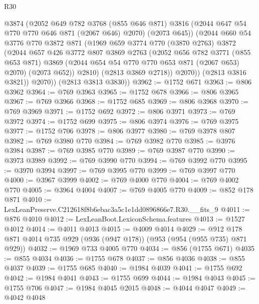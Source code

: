 \begin{lexlean}{R30}
\begin{coremodule}
              @3874
              (@2052
                @649
                @782
                @3768
                (@855 @646 @871)
                @3816
                (@2044 @647 @54 @770 @770 @646 @871 (@2067 @646) @2070)
                (@2073 @645))
              (@2044
                @660
                @54
                @3776
                @770
                @3872
                @871
                (@1969
                  @659
                  @3774
                  @770
                  (@3870 @2763)
                  @3872
                  (@2044
                    @657
                    @426
                    @3772
                    @807
                    @3869
                    @2763
                    (@2052
                      @656
                      @782
                      @3771
                      (@855 @653 @871)
                      @3869
                      (@2044 @654 @54 @770 @770 @653 @871 (@2067 @653) @2070)
                      (@2073 @652))
                    @2810)
                  (@2813 @3869 @2718))
                @2070))
            (@2813 @3816 @3821))
          @2070))
      (@2813 @3813 @3830))
@3962 := @1752 @671
@3963 := @806 @3962
@3964 := @769 @3963
@3965 := @1752 @678
@3966 := @806 @3965
@3967 := @769 @3966
@3968 := @1752 @685
@3969 := @806 @3968
@3970 := @769 @3969
@3971 := @1752 @692
@3972 := @806 @3971
@3973 := @769 @3972
@3974 := @1752 @699
@3975 := @806 @3974
@3976 := @769 @3975
@3977 := @1752 @706
@3978 := @806 @3977
@3980 := @769 @3978 @807
@3982 := @769 @3980 @770
@3984 := @769 @3982 @770
@3985 := @3976 @3984
@3987 := @769 @3985 @770
@3989 := @769 @3987 @770
@3990 := @3973 @3989
@3992 := @769 @3990 @770
@3994 := @769 @3992 @770
@3995 := @3970 @3994
@3997 := @769 @3995 @770
@3999 := @769 @3997 @770
@4000 := @3967 @3999
@4002 := @769 @4000 @770
@4004 := @769 @4002 @770
@4005 := @3964 @4004
@4007 := @769 @4005 @770
@4009 := @852 @178 @871
@4010 := LexLeanPreserve.C212618f8b6ebac3a5c1e1dd0896866e7.R30.__fits_9
@4011 := @876 @4010
@4012 := LexLeanBoot.LexiconSchema.features
@4013 := @1527 @4012
@4014 := @4011 @4013
@4015 := @4009 @4014
@4029 := @912 @178 @871 @4014 @735 @929 (@936 (@947 @178)) (@953 (@954 (@955 @735) @871 @929))
@4032 := @1969 @733 @4005 @770
@4034 := @856 (@1755 @671)
@4035 := @855 @4034
@4036 := @1755 @678
@4037 := @856 @4036
@4038 := @855 @4037
@4039 := @1755 @685
@4040 := @1984 @4039
@4041 := @1755 @692
@4042 := @1984 @4041
@4043 := @1755 @699
@4044 := @1984 @4043
@4045 := @1755 @706
@4047 := @1984 @4045 @2015
@4048 := @4044 @4047
@4049 := @4042 @4048

\end{coremodule}
\end{lexlean}
